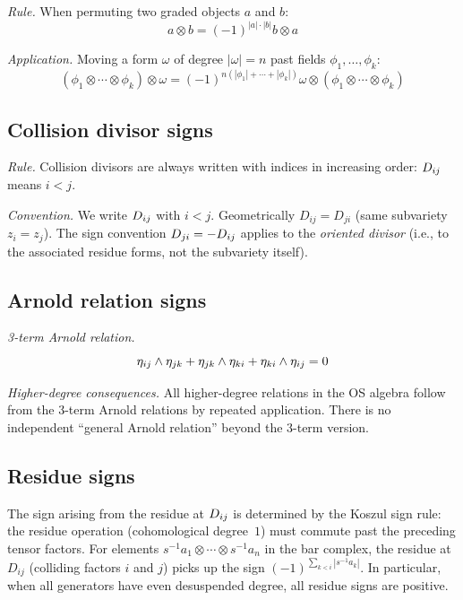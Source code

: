 \emph{Rule.} When permuting two graded objects $a$ and $b$:
\[a \otimes b = (-1)^{|a| \cdot |b|} b \otimes a\]

\emph{Application.} Moving a form $\omega$ of degree $|\omega| = n$ past fields $\phi_1, \ldots, \phi_k$:
\[(\phi_1 \otimes \cdots \otimes \phi_k) \otimes \omega = (-1)^{n(|\phi_1| + \cdots + |\phi_k|)} \omega \otimes (\phi_1 \otimes \cdots \otimes \phi_k)\]

\subsection{Collision divisor signs}

\emph{Rule.} Collision divisors are always written with indices in increasing order: $D_{ij}$ means $i < j$.

\emph{Convention.} We write $D_{ij}$ with $i < j$.  Geometrically $D_{ij} = D_{ji}$ (same subvariety $z_i = z_j$).  The sign convention $D_{ji} = -D_{ij}$ applies to the \emph{oriented divisor} (i.e., to the associated residue forms, not the subvariety itself).

\subsection{Arnold relation signs}

\emph{3-term Arnold relation.}
\[\eta_{ij} \wedge \eta_{jk} + \eta_{jk} \wedge \eta_{ki} + \eta_{ki} \wedge \eta_{ij} = 0\]

\emph{Higher-degree consequences.}
All higher-degree relations in the OS algebra follow from the 3-term Arnold relations by repeated application. There is no independent ``general Arnold relation'' beyond the 3-term version.

\subsection{Residue signs}

The sign arising from the residue at $D_{ij}$ is determined by the Koszul sign rule: the residue operation (cohomological degree~$1$) must commute past the preceding tensor factors.  For elements $s^{-1}a_1 \otimes \cdots \otimes s^{-1}a_n$ in the bar complex, the residue at $D_{ij}$ (colliding factors $i$ and $j$) picks up the sign $(-1)^{\sum_{k<i}|s^{-1}a_k|}$.  In particular, when all generators have even desuspended degree, all residue signs are positive.

